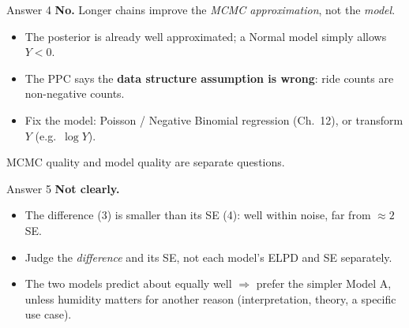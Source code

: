 \documentclass[aspectratio=43,11pt]{beamer}
\begin{document}
{\begin{frame}{Answer 4}
  \textbf{No.} Longer chains improve the \emph{MCMC approximation},
  not the \emph{model}.
  \begin{itemize}
    \item The posterior is already well approximated; a Normal model
      simply allows $Y < 0$.
    \item The PPC says the \textbf{data structure assumption is wrong}:
      ride counts are non-negative counts.
    \item Fix the model: Poisson / Negative Binomial regression
      (Ch.\ 12), or transform $Y$ (e.g.\ $\log Y$).
  \end{itemize}
  MCMC quality and model quality are separate questions.
\end{frame}

\begin{frame}{Answer 5}
  \textbf{Not clearly.}
  \begin{itemize}
    \item The difference (3) is smaller than its SE (4): well within
      noise, far from $\approx 2$ SE.
    \item Judge the \emph{difference} and its SE, not each model's
      ELPD and SE separately.
    \item The two models predict about equally well $\Rightarrow$ prefer
      the simpler Model A, unless humidity matters for another
      reason (interpretation, theory, a specific use case).
  \end{itemize}
\end{frame}
}
\end{document}
